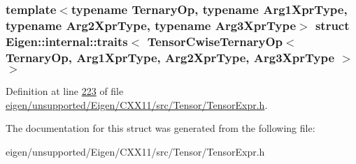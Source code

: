 \subsubsection*{template$<$typename Ternary\+Op, typename Arg1\+Xpr\+Type, typename Arg2\+Xpr\+Type, typename Arg3\+Xpr\+Type$>$\newline
struct Eigen\+::internal\+::traits$<$ Tensor\+Cwise\+Ternary\+Op$<$ Ternary\+Op, Arg1\+Xpr\+Type, Arg2\+Xpr\+Type, Arg3\+Xpr\+Type $>$ $>$}



Definition at line \hyperlink{eigen_2unsupported_2_eigen_2_c_x_x11_2src_2_tensor_2_tensor_expr_8h_source_l00223}{223} of file \hyperlink{eigen_2unsupported_2_eigen_2_c_x_x11_2src_2_tensor_2_tensor_expr_8h_source}{eigen/unsupported/\+Eigen/\+C\+X\+X11/src/\+Tensor/\+Tensor\+Expr.\+h}.



The documentation for this struct was generated from the following file\+:\begin{DoxyCompactItemize}
\item 
eigen/unsupported/\+Eigen/\+C\+X\+X11/src/\+Tensor/\+Tensor\+Expr.\+h\end{DoxyCompactItemize}
